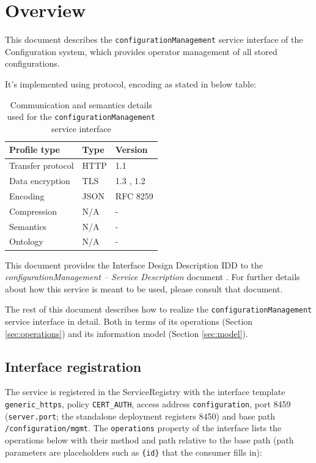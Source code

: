 \documentclass[a4paper]{arrowhead}
\begin{document}
\section{Overview}
\label{sec:overview}

This document describes the \texttt{configuration\allowbreak{}Management} service interface of the Configuration system, which provides operator management of all stored configurations.

It's implemented using protocol, encoding as stated in below table:
\begin{table}[ht!]
  \centering
  \begin{tabular}{|l|l|l|}
    \hline
    \rowcolor{gray!33} Profile type & Type & Version \\ \hline
    Transfer protocol & HTTP & 1.1 \cite{rfc9112} \\ \hline
    Data encryption & TLS & 1.3 \cite{rfc8446}, 1.2 \cite{rfc5246} \\ \hline
    Encoding & JSON & RFC 8259 \cite{rfc8259} \\ \hline
    Compression & N/A & - \\ \hline
    Semantics & N/A & - \\ \hline
    Ontology & N/A & - \\ \hline
  \end{tabular}
  \caption{Communication and semantics details used for the \texttt{configuration\allowbreak{}Management} service interface}
  \label{tab:comunication_semantics_profile}
\end{table}

This document provides the Interface Design Description IDD to the \textit{configurationManagement -- Service Description} document \cite{cfg-configurationManagement-sd}.
For further details about how this service is meant to be used, please consult that document.

The rest of this document describes how to realize the \texttt{configuration\allowbreak{}Management} service
interface in detail. Both in terms of its operations (Section \ref{sec:operations}) and its information model (Section \ref{sec:model}).

\subsection{Interface registration}

The service is registered in the ServiceRegistry with the interface template \texttt{generic\_\allowbreak{}https}, policy \texttt{CERT\_\allowbreak{}AUTH}, access address \texttt{configuration}, port 8459 (\texttt{server.\allowbreak{}port}; the standalone deployment registers 8450) and base path \texttt{/\allowbreak{}configuration/\allowbreak{}mgmt}. The \texttt{operations} property of the interface lists the operations below with their method and path relative to the base path (path parameters are placeholders such as \texttt{\{id\}} that the consumer fills in):
\end{document}
